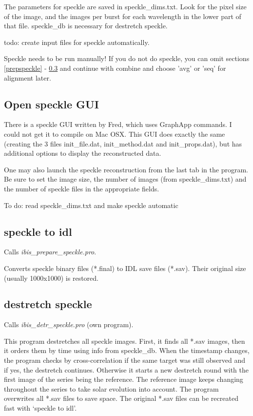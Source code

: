 \documentclass[a4paper,12pt]{article}
\begin{document}
The parameters for speckle are saved in speckle\_dims.txt. Look for the pixel size of the image, and the images per burst for each wavelength in the lower part of that file. speckle\_db is necessary for destretch speckle.

todo: create input files for speckle automatically.

Speckle needs to be run manually! If you do not do speckle, you can omit sections \ref{prepspeckle} - \ref{destrsp} and continue with combine and choose 'avg' or 'seq' for alignment later.

\subsection{Open speckle GUI}
\label{sgui}

There is a speckle GUI written by Fred, which uses GraphApp commands. I could not get it to compile on Mac OSX.
This GUI does exactly the same (creating the 3 files init\_file.dat,
init\_method.dat and init\_props.dat), but has additional options to
display the reconstructed data. 

One may also launch the speckle reconstruction from the last tab in
the program. Be sure to set the image size, the number of images (from
speckle\_dims.txt) and
the number of speckle files in the appropriate fields.

To do: read speckle\_dims.txt and make speckle automatic


\subsection{speckle to idl}
\label{stoi}
Calls \textit{ibis\_prepare\_speckle.pro}.

Converts speckle binary files (*.final) to IDL save files (*.sav). Their original size (usually 1000x1000) is restored.

\subsection{destretch speckle}
\label{destrsp}

Calls \textit{ibis\_detr\_speckle.pro} (own program).

This program destretches all speckle images. First, it finds all *.sav images, then it orders them by time using info from speckle\_db. When the timestamp changes, the program checks by cross-correlation if the same target was still observed and if yes, the destretch continues. Otherwise it starts a new destretch round with the first image of the series being the reference. The reference image keeps changing throughout the series to take solar evolution into account. The program overwrites all *.sav files to save space. The original *.sav files can be recreated fast with `speckle to idl'.
\end{document}

